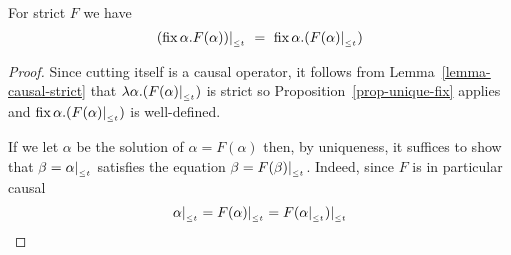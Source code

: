\begin{corollary} 
\label{cor-fix-cut}
For strict $F$ we have
$$
(\mbox{fix}\,\alpha.F(\alpha))|_{_{\leq t}} ~=~  \mbox{fix}\,\alpha.(F(\alpha)|_{_{\leq t}})
$$
\end{corollary}
\begin{proof}
Since cutting itself is a causal operator, it follows from Lemma~\ref{lemma-causal-strict} that $\lambda\alpha.(F(\alpha)|_{_{\leq t}})$ is strict
so Proposition~\ref{prop-unique-fix} applies and $\mbox{fix}\,\alpha.(F(\alpha)|_{_{\leq t}})$
is well-defined.

If we let $\alpha$ be the solution of $\alpha=F(\alpha)$ then, by uniqueness, it suffices to show that $\beta=\alpha|_{_{\leq t}}$ satisfies 
the equation $\beta=F(\beta)|_{_{\leq t}}$. Indeed, since $F$ is in particular causal
$$
\alpha|_{_{\leq t}} = F(\alpha)|_{_{\leq t}} = F(\alpha|_{_{\leq t}})|_{_{\leq t}}
$$


\qquad
\end{proof}

